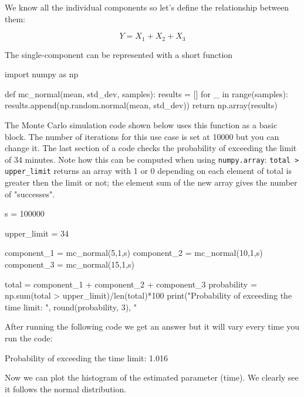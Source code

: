 \cprotEnv\begin{solution}
We know all the individual components so let’s define the relationship between them:

\begin{equation*}
Y = X_1 + X_2 + X_3
\end{equation*}

The single-component can be represented with a short function
\begin{ipython}
import numpy as np

def mc_normal(mean, std_dev, samples):
    results = []
    for _ in range(samples):
        results.append(np.random.normal(mean, std_dev))
    return np.array(results)
\end{ipython}

The Monte Carlo simulation code shown below uses this function as a basic block. The number of iterations for this use case is set at 10000 but you can change it. The last section of a code checks the probability of exceeding the limit of 34 minutes. Note how this can be computed when using \texttt{numpy.array}: \texttt{total > upper\_limit} returns an array with 1 or 0 depending on each element of total is greater then the limit or not; the element sum of the new array gives the number of "successes". 

\begin{ipython}
s = 100000

upper_limit = 34

component_1 = mc_normal(5,1,s)
component_2 = mc_normal(10,1,s)
component_3 = mc_normal(15,1,s)

total = component_1 + component_2 + component_3
probability = np.sum(total > upper_limit)/len(total)*100
print("Probability of exceeding the time limit: ", round(probability, 3), "%
\end{ipython}

After running the following code we get an answer but it will vary every time you run the code:
\begin{ioutput}
Probability of exceeding the time limit:  1.016 %
\end{ioutput}

Now we can plot the histogram of the estimated parameter (time). We clearly see it follows the normal distribution.


\end{solution}
